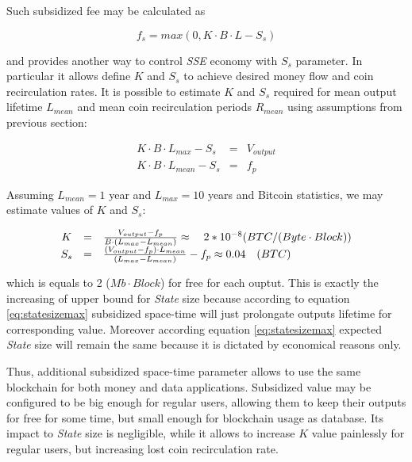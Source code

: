 \documentclass[]{article}   %
\newcommand{\esse}{\textit{SSE}}
\newcommand{\state}{\textit{State}}
\begin{document}
Such subsidized fee may be calculated as

\begin{equation}
f_{s} = max(0, K \cdot B \cdot L - S_s)
\end{equation}

and provides another way to control \esse{} economy with $S_s$ parameter. In particular it allows define $K$ and $S_s$ to achieve desired money flow and coin recirculation rates. It is possible to estimate $K$ and $S_s$ required for mean output lifetime $L_{mean}$ and mean coin recirculation periods $R_{mean}$ using assumptions from previous section:

\begin{equation}
  \begin{array}{ccl}
   K \cdot B \cdot L_{max} - S_s & = & V_{output} \\
   K \cdot B \cdot L_{mean} - S_s & = & f_p
  \end{array}
\end{equation}

Assuming $L_{mean}=1$ year and $L_{max}=10$ years and Bitcoin statistics, we may estimate values of $K$ and $S_s$:

\begin{equation}
  \begin{array}{ccl}
   K & = & {V_{output} - f_p \over B \cdot (L_{max} - L_{mean})} \approx \quad 2*10^{-8} ({BTC / (Byte \cdot Block)}) \\
   S_s & = & {(V_{output} - f_p) \cdot L_{mean} \over (L_{max} - L_{mean})} - f_p \approx 0.04\quad(BTC)
  \end{array}
\end{equation}

which is equals to 2 ($Mb \cdot Block$) for free for each ouptut. This is exactly the increasing of upper bound for \state{} size because according to equation \ref{eq:statesizemax} subsidized space-time will just prolongate outputs lifetime for corresponding value. Moreover according equation \ref{eq:statesizemax} expected \state{} size will remain the same because it is dictated by economical reasons only.

Thus, additional subsidized space-time parameter allows to use the same blockchain for both money and data applications. Subsidized value may be configured to be big enough for regular users, allowing them to keep their outputs for free for some time, but small enough for blockchain usage as database. Its impact to \state{} size is negligible, while it allows to increase $K$ value painlessly for regular users, but increasing lost coin recirculation rate.
\end{document}
